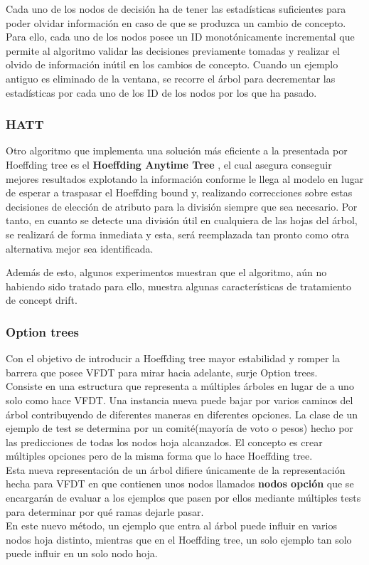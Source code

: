 Cada uno de los nodos de decisión ha de tener las estadísticas suficientes para poder olvidar información en caso de que se produzca un cambio de concepto. Para ello, cada uno de los nodos posee un ID monotónicamente incremental que permite al algoritmo validar las decisiones previamente tomadas y realizar el olvido de información inútil en los cambios de concepto. Cuando un ejemplo antiguo es eliminado de la ventana, se recorre el árbol para decrementar las estadísticas por cada uno de los ID de los nodos por los que ha pasado.


\subsubsection{HATT}

Otro algoritmo que implementa una solución más eficiente a la presentada por Hoeffding tree es el \textbf{Hoeffding Anytime Tree} \cite{ref10}, el cual asegura conseguir mejores resultados explotando la información conforme le llega al modelo en lugar de esperar a traspasar el Hoeffding bound y, realizando correcciones sobre estas decisiones de elección de atributo para la división siempre que sea necesario.
Por tanto, en cuanto se detecte una división útil en cualquiera de las hojas del árbol, se realizará de forma inmediata y esta, será reemplazada tan pronto como otra alternativa mejor sea identificada.

Además de esto, algunos experimentos muestran que el algoritmo, aún no habiendo sido tratado para ello, muestra algunas características de tratamiento de concept drift.

\subsubsection{Option trees}

Con el objetivo de introducir a Hoeffding tree mayor estabilidad y romper la barrera que posee VFDT para mirar hacia adelante, surje Option trees\cite{ref13}.\\
Consiste en una estructura que representa a múltiples árboles en lugar de a uno solo como hace VFDT. Una instancia nueva puede bajar por varios caminos del árbol contribuyendo de diferentes maneras en diferentes opciones. La clase de un ejemplo de test se determina por un comité(mayoría de voto o pesos) hecho por las predicciones de todas los nodos hoja alcanzados. El concepto es crear múltiples opciones pero de la misma forma que lo hace Hoeffding tree.\\
Esta nueva representación de un árbol difiere únicamente de la representación hecha para VFDT en que contienen unos nodos llamados \textbf{nodos opción} que se encargarán de evaluar a los ejemplos que pasen por ellos mediante múltiples tests para determinar por qué ramas dejarle pasar.\\
En este nuevo método, un ejemplo que entra al árbol puede influir en varios nodos hoja distinto, mientras que en el Hoeffding tree, un solo ejemplo tan solo puede influir en un solo nodo hoja.

